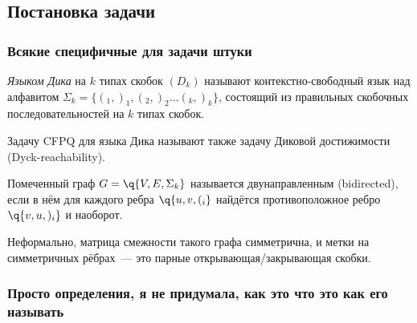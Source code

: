 \begin{definition}

\TODO

\end{definition}

\subsection{Постановка задачи}

\subsubsection{Всякие специфичные для задачи штуки}

\begin{definition}

\TODO

\end{definition}

\begin{definition}

\TODO

\end{definition}

\begin{definition}
    \textit{Языком Дика} на $k$ типах скобок $(D_k)$ называют контекстно-свободный язык над алфавитом $\Sigma_k = \{ (_1, )_1, (_2, )_2 \dots (_k, )_k \}$, состоящий из правильных скобочных последовательностей на $k$ типах скобок.

    Задачу CFPQ для языка Дика называют также задачу Диковой достижимости (Dyck-reachability).
\end{definition}

\begin{definition}

\TODO

\end{definition}

\begin{definition}
    Помеченный граф $G = \q{V, E, \Sigma_k}$ называется двунаправленным (bidirected), если в нём для каждого ребра $\q{u, v, (_i}$ найдётся противоположное ребро $\q{v, u, )_i}$ и наоборот.

    Неформально, матрица смежности такого графа симметрична, и метки на симметричных рёбрах~--- это парные открывающая/закрывающая скобки.
\end{definition}

\subsubsection{Просто определения, я не придумала, как это что это как его называть}

\begin{definition}
    \TODO
\end{definition}
